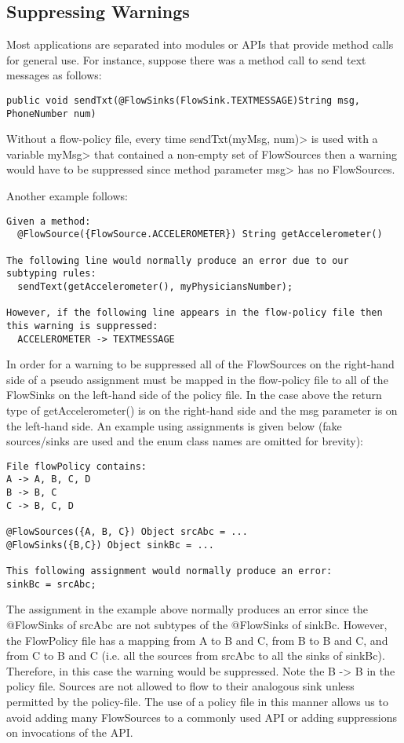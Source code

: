 \subsection{Suppressing Warnings}
Most applications are separated into modules or APIs that
provide method calls for general use.  For instance, suppose there
was a method call to send text messages as follows:
\begin{Verbatim}
public void sendTxt(@FlowSinks(FlowSink.TEXTMESSAGE)String msg, PhoneNumber num)
\end{Verbatim}

Without a flow-policy file, every time \<sendTxt(myMsg, num)> is
used with a variable \<myMsg> that contained a non-empty set of
FlowSources then a warning would have to be suppressed since method
parameter \<msg> has no FlowSources.

Another example follows:

\begin{Verbatim}
Given a method:
  @FlowSource({FlowSource.ACCELEROMETER}) String getAccelerometer()

The following line would normally produce an error due to our subtyping rules:
  sendText(getAccelerometer(), myPhysiciansNumber);

However, if the following line appears in the flow-policy file then this warning is suppressed:
  ACCELEROMETER -> TEXTMESSAGE
\end{Verbatim}

In order for a warning to be suppressed all of the FlowSources
on the right-hand side of a pseudo assignment must be mapped
in the flow-policy file to all of the FlowSinks on the left-hand
side of the policy file.  In the case above the return type of
getAccelerometer() is on the right-hand side and the msg
parameter is on the left-hand side.  An example using
assignments is given below (fake sources/sinks are used and the
enum class names are omitted for brevity):

\begin{Verbatim}
File flowPolicy contains:
A -> A, B, C, D
B -> B, C
C -> B, C, D

@FlowSources({A, B, C}) Object srcAbc = ...
@FlowSinks({B,C}) Object sinkBc = ...

This following assignment would normally produce an error:
sinkBc = srcAbc;
\end{Verbatim}

The assignment in the example above normally produces an error
since the @FlowSinks of srcAbc are not subtypes of the
@FlowSinks of sinkBc.  However, the FlowPolicy file has a
mapping from A to B and C, from B to B and C, and from C to B
and C (i.e. all the sources from srcAbc to all the sinks of
sinkBc).   Therefore, in this case the warning would be
suppressed.  Note the B -> B in the policy file.  Sources
are not allowed to flow to their analogous sink unless
permitted by the policy-file.  The use of a policy file in
this manner allows us to avoid adding many FlowSources to a
commonly used API or adding suppressions on invocations of
the API.

